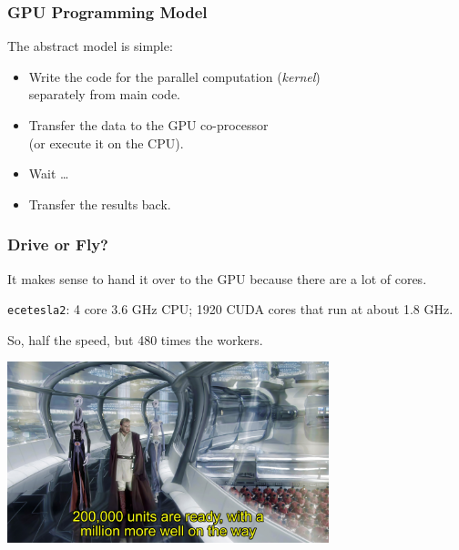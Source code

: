 \begin{frame}
  \frametitle{GPU Programming Model}



  The abstract model is simple:

  \begin{itemize}
    \item Write the code for the parallel computation ({\it kernel}) \\
      \qquad separately from main code.
    \item Transfer the data to the GPU co-processor \\
      \qquad (or execute it on the CPU).
    \item Wait \ldots
    \item Transfer the results back.
  \end{itemize}

\end{frame}


\begin{frame}
\frametitle{Drive or Fly?}

It makes sense to hand it over to the GPU because there are a lot of cores.

\texttt{ecetesla2}: 4 core 3.6 GHz CPU; 1920 CUDA cores that run at about 1.8 GHz. 

So, half the speed, but 480 times the workers. 

\begin{center}
	\includegraphics[width=0.7\textwidth]{images/units.jpg}
\end{center}

\end{frame}


